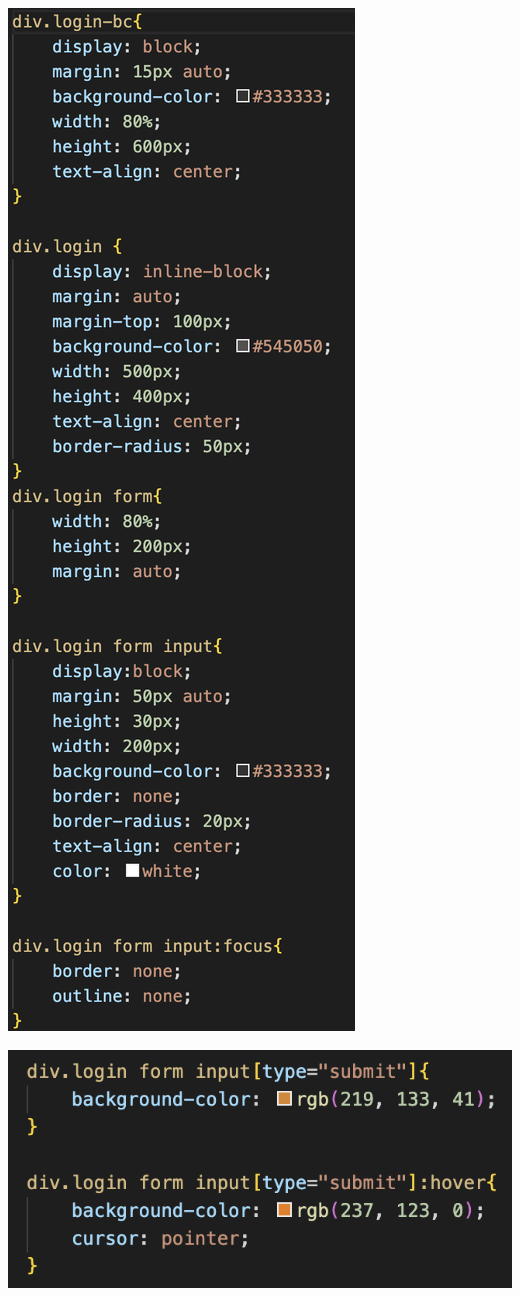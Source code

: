 \documentclass[12pt, letterpaper]{article}
\begin{document}
\begin{center}
	\includegraphics[scale=0.6]{style5}
\end{center}

\begin{center}
	\includegraphics[scale=0.6]{style6}
\end{center}
\end{document}
